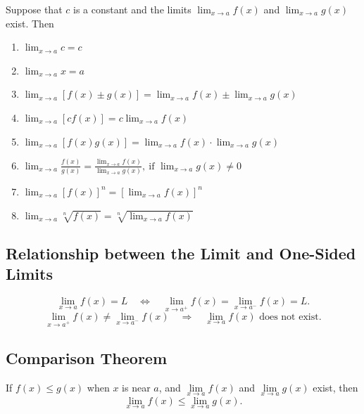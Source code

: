 \documentclass[a4paper,11pt]{article}
\begin{document}
\begin{tcolorbox}
    Suppose that \(c\) is a constant and the limits \(\displaystyle \lim_{x \to a} f(x)\) and \(\displaystyle \lim_{x \to a} g(x)\) exist. Then
    \begin{enumerate}
        \item \(\displaystyle \lim_{x \to a} c = c\)
        \item \(\displaystyle \lim_{x \to a} x = a\)
        \item \(\displaystyle \lim_{x \to a} [f(x) \pm g(x)] = \lim_{x \to a} f(x) \pm \lim_{x \to a} g(x)\)
        \item \(\displaystyle \lim_{x \to a} [c f(x)] = c \lim_{x \to a} f(x)\)
        \item \(\displaystyle \lim_{x \to a} [f(x) g(x)] = \lim_{x \to a} f(x) \cdot \lim_{x \to a} g(x)\)
        \item \(\displaystyle \lim_{x \to a} \frac{f(x)}{g(x)} = \frac{\displaystyle \lim_{x \to a} f(x)}{\displaystyle \lim_{x \to a} g(x)},\ \text{if } \lim_{x \to a} g(x) \neq 0\)
        \item \(\displaystyle \lim_{x \to a} [f(x)]^n = [\lim_{x \to a} f(x)]^n\)
        \item \(\displaystyle \lim_{x \to a} \sqrt[n]{f(x)} = \sqrt[n]{\lim_{x \to a} f(x)}\)
    \end{enumerate}
\end{tcolorbox}




\subsection{Relationship between the Limit and One-Sided Limits}

\begin{tcolorbox}
    \[\lim_{x \to a} f(x) = L \quad \Leftrightarrow \quad \lim_{x \to a^+} f(x) = \lim_{x \to a^-} f(x) = L.\]
    \[\lim_{x \to a^+} f(x) \neq \lim_{x \to a^-} f(x) \quad \Rightarrow \quad \lim_{x \to a} f(x) \text{ does not exist}.\]
\end{tcolorbox}




\subsection{Comparison Theorem}

\begin{tcolorbox}
    If \( f(x) \leq g(x) \) when \( x \) is near \( a \), and \(\lim\limits_{x \to a} f(x)\) and \(\lim\limits_{x \to a} g(x)\) exist, then \[\lim\limits_{x \to a} f(x) \leq \lim\limits_{x \to a} g(x).\]
\end{tcolorbox}
\end{document}
